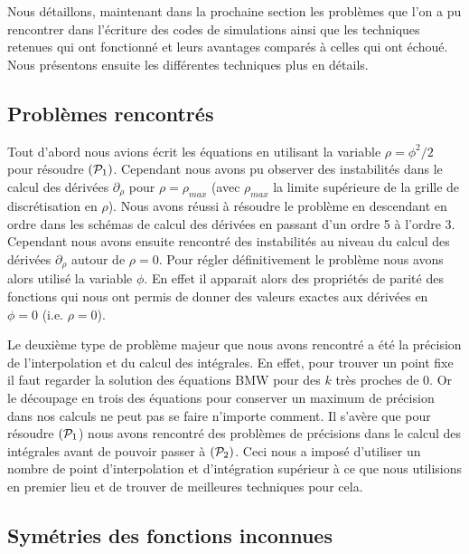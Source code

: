 \documentclass[10.5pt]{article}
\begin{document}
\begin{multicols}{2}
Nous détaillons, maintenant dans la prochaine section les problèmes que l'on a pu rencontrer dans l'écriture des codes de simulations ainsi que les techniques retenues qui ont fonctionné et leurs avantages comparés à celles qui ont échoué. Nous présentons ensuite les différentes techniques plus en détails. 





\subsection{Problèmes rencontrés}

\label{sec:Problemes}

Tout d'abord nous avions écrit les équations en utilisant la variable $\rho = \phi^2/2$ pour résoudre $(\mathcal{P}_1)$. Cependant nous avons pu observer des instabilités dans le calcul des dérivées $\partial_\rho$ pour $\rho = \rho_{max}$ (avec $\rho_{max}$ la limite supérieure de la grille de discrétisation en $\rho$). Nous avons réussi à résoudre le problème en descendant en ordre dans les schémas de calcul des dérivées en passant d'un ordre 5 à l'ordre 3. Cependant nous avons ensuite rencontré des instabilités au niveau du calcul des dérivées $\partial_{\rho}$ autour de $\rho = 0$. Pour régler définitivement le problème nous avons alors utilisé la variable $\phi$. En effet il apparait alors des propriétés de parité des fonctions qui nous ont permis de donner des valeurs exactes aux dérivées en $\phi = 0$ (i.e. $\rho = 0$). 

Le deuxième type de problème majeur que nous avons rencontré a été la précision de l'interpolation et du calcul des intégrales. En effet, pour trouver un point fixe il faut regarder la solution des équations BMW pour des $k$ très proches de 0. Or le découpage en trois des équations pour conserver un maximum de précision dans nos calculs ne peut pas se faire n'importe comment. Il s'avère que pour résoudre $(\mathcal{P}_1$) nous avons rencontré des problèmes de précisions dans le calcul des intégrales avant de pouvoir passer à $(\mathcal{P}_2)$. Ceci nous a imposé d'utiliser un nombre de point d'interpolation et d'intégration supérieur à ce que nous utilisions en premier lieu et de trouver de meilleures techniques pour cela. 



\subsection{Symétries des fonctions inconnues}


\end{multicols}
\end{document}

